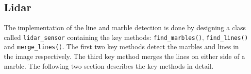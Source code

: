 \documentclass[../Head/Main.tex]{subfiles}
\begin{document}
\subsection{Lidar}
The implementation of the line and marble detection is done by designing a class called \texttt{lidar\_sensor} containing the key methods: \texttt{find\_marbles()}, \texttt{find\_lines()} and \texttt{merge\_lines()}. The first two key methods detect the marbles and lines in the image respectively. The third key method merges the lines on either side of a marble. The following two section describes the key methods in detail.


\end{document}
